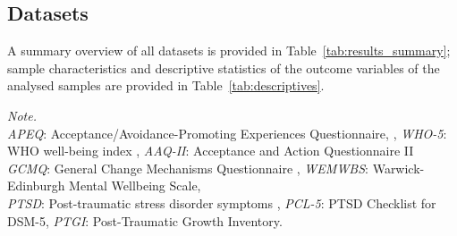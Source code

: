 \documentclass[man,floatsintext]{apa7}
\newcommand{\change}[1]{#1}
\begin{document}
\subsection{Datasets}

A summary overview of all datasets is provided in Table~\ref{tab:results_summary}; sample characteristics and descriptive statistics of the outcome variables of the analysed samples are provided in Table~\ref{tab:descriptives}.

\begin{table}[!htbp]
\small\renewcommand{\arraystretch}{0.9}%

    \caption{Overview of the datasets and main results for all outcome variables considered here. \change{$R^2$ values are cross-validated (held-out) $R^2$ from the repeated nested cross-validation, with \res{set.nprin} PCA components per free-text response. The baseline + text model contains all free-text responses of the dataset (the designated test); $\Delta R^2$ is tested with the corrected repeated $k$-fold $t$-test.}}

    \centering
    \begin{threeparttable}

    

\begin{tablenotes}[flushleft]
\small
\item \change{\textit{Note.}\\ \textit{APEQ}: Acceptance/Avoidance-Promoting Experiences Questionnaire, \cite{wolff2022acceptance}, \textit{WHO-5}: WHO well-being index , \textit{AAQ-II}: Acceptance and Action
Questionnaire II\\ \textit{GCMQ}: General Change Mechanisms Questionnaire \cite{wolff2024measuring}, \textit{WEMWBS}: Warwick-Edinburgh Mental Wellbeing Scale, \\ \textit{PTSD}: Post-traumatic stress disorder symptoms \cite{evens2026post}, \textit{PCL-5}: PTSD Checklist for DSM-5, \textit{PTGI}:  Post-Traumatic Growth Inventory.}
\end{tablenotes}

\end{threeparttable}
    \label{tab:results_summary}
\end{table}
\end{document}
